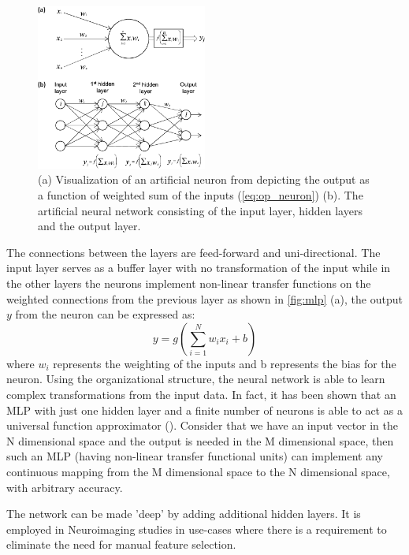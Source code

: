\documentclass[msthesis.tex]{subfiles}
\begin{document}
\begin{figure}
    \centering
    \includegraphics[width=0.5\textwidth]{images/tnn_ann.png}
    \caption{(a) Visualization of an artificial neuron from \cite{vieira2017using} depicting the output as a function of weighted sum of the inputs (\autoref{eq:op_neuron}) (b). The artificial neural network consisting of the input layer, hidden layers and the output layer.}
    \label{fig:mlp}
\end{figure}
The connections between the layers are feed-forward and uni-directional. The input layer serves as a buffer layer with no transformation of the input while in the other layers the neurons implement non-linear transfer functions on the weighted connections from the previous layer as shown in \autoref{fig:mlp} (a), the output $y$ from the neuron can be expressed as:
\begin{equation}
    \label{eq:op_neuron}
    y = g(\sum_{i=1}^{N} w_i x_i +b) 
\end{equation}
where $w_i$ represents the weighting of the inputs and b represents the bias for the neuron. Using the organizational structure, the neural network is able to learn complex transformations from the input data. In fact, it has been shown that an MLP with just one hidden layer and a finite number of neurons is able to act as a universal function approximator (\cite{universal_mlp}). Consider that we have an input vector in the N dimensional space and the output is needed in the M dimensional space, then such an MLP (having non-linear transfer functional units) can implement any continuous mapping from the M dimensional space to the N dimensional space, with arbitrary accuracy. 

The network can be made 'deep' by adding additional hidden layers. It is employed in Neuroimaging studies in use-cases where there is a requirement to eliminate the need for manual feature selection.
\end{document}
